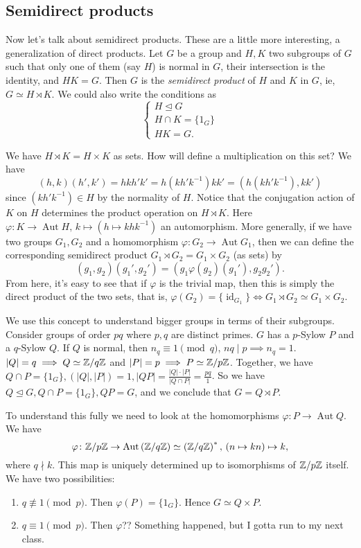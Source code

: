 \subsection{Semidirect products}
Now let's talk about semidirect products. These are a little more interesting, a generalization of direct products. Let $G$ be a group and $H,K$ two subgroups of $G$ such that only one of them (say $H$) is normal in $G$, their intersection is the identity, and $HK=G$. Then $G$ is the \emph{semidirect product} of $H$ and $K$ in $G$, ie, $G\simeq H \rtimes K$. We could also write the conditions as \[
\begin{cases}
    H \trianglelefteq G\\
    H\cap K=\{1_G\} \\
    HK=G.
\end{cases}
\] 
\begin{remark}
    We have $H \rtimes K=H\times K$ as sets. How will define a multiplication on this set? We have \[
        (h,k)(h',k')=hkh'k'=h(kh'k^{-1})kk'=(h(kh'k^{-1}),kk')
    \] since $(kh'k^{-1})\in H$ by the normality of $H$. Notice that the conjugation action of $K$ on $H$ determines the product operation on $H \rtimes K$. Here $\varphi \colon K \to \operatorname{Aut}H,\, k\mapsto (h \mapsto khk^{-1})$ an automorphism. More generally, if we have two groups $G_1,G_2$ and a homomorphism $\varphi \colon G_2 \to \operatorname{Aut}G_1$, then we can define the corresponding semidirect product $G_1 \rtimes G_2=G_1\times G_2$ (as sets) by \[
    (g_1,g_2)(g_1',g_2')=(g_1\varphi (g_2)(g_1'),g_2g_2').
\] From here, it's easy to see that if $\varphi $ is the trivial map, then this is simply the direct product of the two sets, that is, $\varphi (G_2)=\{\operatorname{id}_{G_1}\} \iff G_1 \rtimes G_2\simeq G_1\times G_2$.
\end{remark}
We use this concept to understand bigger groups in terms of their subgroups. Consider groups of order $pq$ where $p,q$ are distinct primes. $G$ has a $p$-Sylow $P$ and a $q$-Sylow $Q$. If $Q$ is normal, then $n_q\equiv 1 \pmod q$, $nq  \mid p \implies n_q=1$. $|Q|=q\implies Q\simeq\mathbb{Z} /q\mathbb{Z}$ and $|P|=p\implies P\simeq\mathbb{Z} /p\mathbb{Z}$. Together, we have $Q\cap P=\{1_G\} , (|Q|,|P|)=1, |QP|=\frac{|Q|\cdot |P|}{|Q\cap P|}=\frac{pq}{1}$. So we have $Q\trianglelefteq G,Q\cap P=\{1_G\} ,QP=G$, and we conclude that $G=Q \rtimes P$.

To understand this fully we need to look at the homomorphisms $\varphi \colon P \to \operatorname{Aut}Q$. We have \[
    \varphi \colon \mathbb{Z} /p\mathbb{Z} \to \operatorname{Aut}\left( \mathbb{Z} /q\mathbb{Z} \right)  \simeq \left( \mathbb{Z} /q\mathbb{Z} \right)^* ,\, (n\mapsto kn)\mapsto k,
\] where $q\nmid k.$ This map is uniquely determined up to isomorphisms of  $\mathbb{Z} /p\mathbb{Z}$ itself. We have two possibilities:
\begin{enumerate}
    \item $q\not\equiv 1 \pmod p$. Then $\varphi (P)=\{1_G\} .$ Hence $G\simeq Q\times P$. 
    \item $q\equiv 1 \pmod p$. Then $\varphi $?? Something happened, but I gotta run to my next class.
\end{enumerate}
